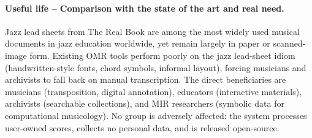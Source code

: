 \documentclass[11pt, a4paper]{article}
\begin{document}
\paragraph{Useful life -- Comparison with the state of the art and real need.}
Jazz lead sheets from The Real Book are among the most widely used musical documents in jazz education worldwide, yet remain largely in paper or scanned-image form. Existing OMR tools perform poorly on the jazz lead-sheet idiom (handwritten-style fonts, chord symbols, informal layout), forcing musicians and archivists to fall back on manual transcription. The direct beneficiaries are musicians (transposition, digital annotation), educators (interactive materials), archivists (searchable collections), and MIR researchers (symbolic data for computational musicology). No group is adversely affected: the system processes user-owned scores, collects no personal data, and is released open-source.


\newpage
\printbibliography[heading=bibintoc, title={References}]
\end{document}
